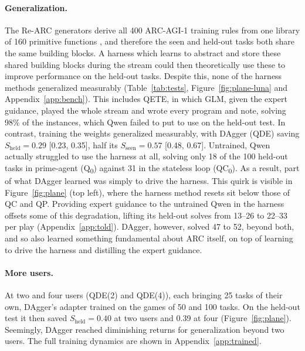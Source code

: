 \paragraph{Generalization.}
The Re-ARC generators derive all 400 ARC-AGI-1 training rules from one library of 160 primitive functions \citep{hodel2024rearc}, and therefore the seen and held-out tasks both share the same building blocks. A harness which learns to abstract and store these shared building blocks during the stream could then theoretically use these to improve performance on the held-out tasks. Despite this, none of the harness methods generalized measurably (Table~\ref{tab:tests}, Figure~\ref{fig:plane-luna} and Appendix~\ref{app:bench}). This includes QETE, in which GLM, given the expert guidance, played the whole stream and wrote every program and note, solving 98\% of the instances, which Qwen failed to put to use on the held-out test. In contrast, training the weights generalized measurably, with DAgger (QDE) saving $S_{\mathrm{held}} = 0.29$ [0.23, 0.35], half its $S_{\mathrm{seen}} = 0.57$ [0.48, 0.67]. Untrained, Qwen actually struggled to use the harness at all, solving only 18 of the 100 held-out tasks in prime-agent (Q\textsubscript{0}) against 31 in the stateless loop (QC\textsubscript{0}). As a result, part of what DAgger learned was simply to drive the harness. This quirk is visible in Figure~\ref{fig:plane} (top left), where the harness method resets sit below those of QC and QP. Providing expert guidance to the untrained Qwen in the harness offsets some of this degradation, lifting its held-out solves from 13--26 to 22--33 per play (Appendix~\ref{app:told}). DAgger, however, solved 47 to 52, beyond both, and so also learned something fundamental about ARC itself, on top of learning to drive the harness and distilling the expert guidance.

\paragraph{More users.}
At two and four users (QDE(2) and QDE(4)), each bringing 25 tasks of their own, DAgger's adapter trained on the games of 50 and 100 tasks. On the held-out test it then saved $S_{\mathrm{held}} = 0.40$ at two users and 0.39 at four (Figure~\ref{fig:plane}). Seemingly, DAgger reached diminishing returns for generalization beyond two users. The full training dynamics are shown in Appendix~\ref{app:trained}.
\FloatBarrier
